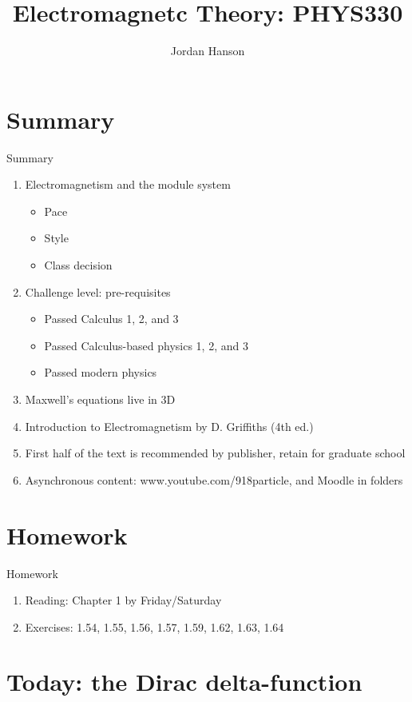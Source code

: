 \documentclass{beamer}
\title{Electromagnetc Theory: PHYS330}
\author{Jordan Hanson}
\institute{Whittier College Department of Physics and Astronomy}
\begin{document}
\maketitle

\section{Summary}

\begin{frame}{Summary}
\begin{enumerate}
\item Electromagnetism and the module system
\begin{itemize}
\item Pace
\item Style
\item Class decision
\end{itemize}
\item Challenge level: pre-requisites
\begin{itemize}
\item Passed Calculus 1, 2, and 3
\item Passed Calculus-based physics 1, 2, and 3
\item Passed modern physics
\end{itemize}
\item Maxwell's equations live in 3D
\item \alert{Introduction to Electromagnetism by D. Griffiths (4th ed.)}
\item First half of the text is recommended by publisher, retain for graduate school
\item Asynchronous content: www.youtube.com/918particle, and Moodle in folders
\end{enumerate}
\end{frame}

\section{Homework}

\begin{frame}{Homework}
\begin{enumerate}
\item Reading: Chapter 1 by Friday/Saturday
\item Exercises: 1.54, 1.55, 1.56, 1.57, 1.59, 1.62, 1.63, 1.64
\end{enumerate}
\end{frame}

\section{Today: the Dirac delta-function}
\end{document}
